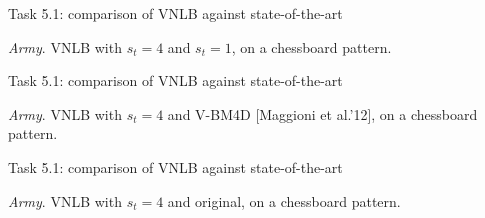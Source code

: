 \documentclass[mathserif, 8pt]{beamer}
\makeatletter
\newcounter{multipleslide}
\newcommand{\restoreframe}{%
\patchcmd{\beamer@@tmpl@footline}%
	{\themultipleslide}%
	{\insertframenumber}%
	{}%
	{}%
\setcounter{framenumber}{\value{multipleslide}}%
}
\newcommand{\reference}[1] {{\color{gray} [#1]}}
\makeatother
\begin{document}
\begin{frame}{Task 5.1: comparison of VNLB against state-of-the-art}
	\begin{center}
	\end{center}

	\begin{center}
		\emph{Army}. VNLB with $s_t = 4$ and $s_t = 1$, on a chessboard pattern.
	\end{center}
\end{frame}
\begin{frame}{Task 5.1: comparison of VNLB against state-of-the-art}
	\begin{center}
	\end{center}

	\begin{center}
		\emph{Army}. VNLB with $s_t = 4$ and V-BM4D \reference{Maggioni et al.'12}, on a chessboard pattern.
	\end{center}
\end{frame}
\begin{frame}{Task 5.1: comparison of VNLB against state-of-the-art}
	\begin{center}
	\end{center}

	\begin{center}
		\emph{Army}. VNLB with $s_t = 4$ and original, on a chessboard pattern.
	\end{center}
\end{frame}
\restoreframe
\end{document}
